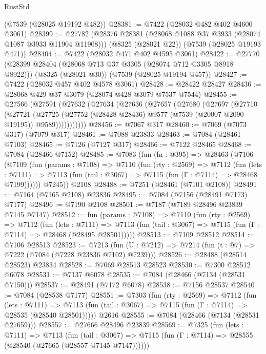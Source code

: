 \begin{lexlean}{RustStd}
\begin{coremodule}
    (@7539 (@28025 @19192 @482))
@28381 := @7422 (@28032 @482 @402 @4600 @3061)
@28399 := @27782
    (@28376 @28381 (@28068 @1088 @37 @3933 (@28074 @1087 @3933 @11904 @11908)))
    (@8325 (@28021 @22))
    (@7539 (@28025 @19193 @471))
@28404 := @7422 (@28032 @471 @402 @4595 @3061)
@28422 := @27770
    (@28399 @28404 (@28068 @713 @37 @3305 (@28074 @712 @3305 @8918 @8922)))
    (@8325 (@28021 @30))
    (@7539 (@28025 @19194 @457))
@28427 := @7422 (@28032 @457 @402 @4578 @3061)
@28428 := @28422 @28427
@28436 := @28068 @429 @37 @3079 (@28074 @428 @3079 @7537 @7544)
@28455 := @27566
    (@27591
      (@27632
        (@27634
          (@27636
            (@27657
              (@27680
                (@27697
                  (@27710
                    (@27721
                      (@27725
                        (@27752 (@28428 @28436) @9577 (@7539 (@20007 @2090 @19195)) @9589)))))))))))
@28456 := @7067 @317
@28460 := @7069 (@7073 @317) (@7079 @317)
@28461 := @7088 @23833
@28463 := @7084 (@28461 @7103)
@28465 := @7126 (@7127 @317)
@28466 := @7122 @28465
@28468 := @7084 (@28466 @7152)
@28485 := @7083
    (fun (fn : @395) =>
    @28463
      (@7106
        (@7109
          (fun (params : @7108) =>
          @7110
            (fun (rty : @2569) =>
            @7112
              (fun (lets : @7111) =>
              @7113 (fun (tail : @3067) => @7115 (fun (Γ : @7114) => @28468 @7199))))))
        @7245))
    @2108
@28488 := @7251 (@28461 (@7101 @2108))
@28491 := @7164 (@7165 @2108) @23836
@28495 := @7084 (@7156 (@28491 @7173) @7177)
@28496 := @7190 @2108
@28501 := @7187 (@7189 @28496 @23839 @7145 @7147)
@28512 := fun (params : @7108) =>
  @7110
    (fun (rty : @2569) =>
    @7112
      (fun (lets : @7111) =>
      @7113 (fun (tail : @3067) => @7115 (fun (Γ : @7114) => @28468 (@28495 @28501)))))
@28513 := @7109 @28512
@28514 := @7106 @28513
@28523 := @7213
    (fun (U : @7212) => @7214 (fun (t : @7) => @7222 (@7084 (@7228 @23836 @7102) @7239)))
@28526 := @28488 (@28514 @28523) @23834
@28528 := @7069 @28513 @28523
@28530 := @7300 @28512 @6078
@28531 := @7137 @6078
@28535 := @7084 (@28466 (@7134 (@28531 @7150)))
@28537 := @28491 (@7172 @6078)
@28538 := @7156 @28537
@28540 := @7084 (@28538 @7177)
@28551 := @7303
    (fun (rty : @2569) =>
    @7112
      (fun (lets : @7111) =>
      @7113 (fun (tail : @3067) => @7115 (fun (Γ : @7114) => @28535 (@28540 @28501)))))
    @2616
@28555 := @7084 (@28466 (@7134 (@28531 @27659)))
@28557 := @27666 @28496 @23839
@28569 := @7325
    (fun (lets : @7111) =>
    @7113
      (fun (tail : @3067) =>
      @7115 (fun (Γ : @7114) => @28555 (@28540 (@27665 (@28557 @7145 @7147))))))

\end{coremodule}
\end{lexlean}
